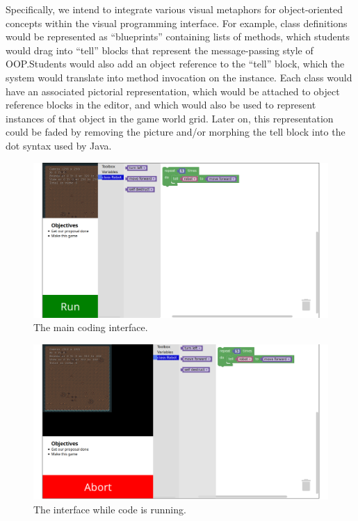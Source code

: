 \documentclass[12pt,notitlepage]{article}
\begin{document}
Specifically, we intend to integrate various visual metaphors for
object-oriented concepts within the visual programming interface. For
example, class definitions would be represented as ``blueprints''
containing lists of methods, which students would drag into ``tell''
blocks that represent the message-passing style of OOP.\@ Students
would also add an object reference to the ``tell'' block, which the
system would translate into method invocation on the instance. Each
class would have an associated pictorial representation, which would
be attached to object reference blocks in the editor, and which would
also be used to represent instances of that object in the game world
grid. Later on, this representation could be faded by removing the
picture and/or morphing the tell block into the dot syntax used by
Java.

\begin{figure}[h]
  \centering
  \includegraphics[width=\textwidth]{mockup1.png}
  \caption{The main coding interface.}
\end{figure}

\begin{figure}[h]
  \centering
  \includegraphics[width=\textwidth]{mockup2.png}
  \caption{The interface while code is running.}
\end{figure}
\end{document}
